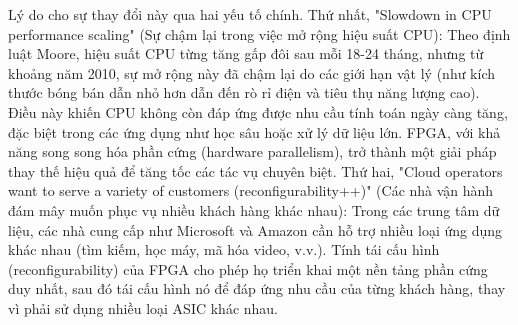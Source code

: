 \documentclass[a4paper]{article}
\begin{document}
\begin{itemize}
    Lý do cho sự thay đổi này qua hai yếu tố chính. Thứ nhất, "Slowdown in CPU performance scaling" (Sự chậm lại trong việc mở rộng hiệu suất CPU): Theo định luật Moore, hiệu suất CPU từng tăng gấp đôi sau mỗi 18-24 tháng, nhưng từ khoảng năm 2010, sự mở rộng này đã chậm lại do các giới hạn vật lý (như kích thước bóng bán dẫn nhỏ hơn dẫn đến rò rỉ điện và tiêu thụ năng lượng cao). Điều này khiến CPU không còn đáp ứng được nhu cầu tính toán ngày càng tăng, đặc biệt trong các ứng dụng như học sâu hoặc xử lý dữ liệu lớn. FPGA, với khả năng song song hóa phần cứng (hardware parallelism), trở thành một giải pháp thay thế hiệu quả để tăng tốc các tác vụ chuyên biệt. Thứ hai, "Cloud operators want to serve a variety of customers (reconfigurability++)" (Các nhà vận hành đám mây muốn phục vụ nhiều khách hàng khác nhau): Trong các trung tâm dữ liệu, các nhà cung cấp như Microsoft và Amazon cần hỗ trợ nhiều loại ứng dụng khác nhau (tìm kiếm, học máy, mã hóa video, v.v.). Tính tái cấu hình (reconfigurability) của FPGA cho phép họ triển khai một nền tảng phần cứng duy nhất, sau đó tái cấu hình nó để đáp ứng nhu cầu của từng khách hàng, thay vì phải sử dụng nhiều loại ASIC khác nhau.

\end{itemize}
\end{document}
